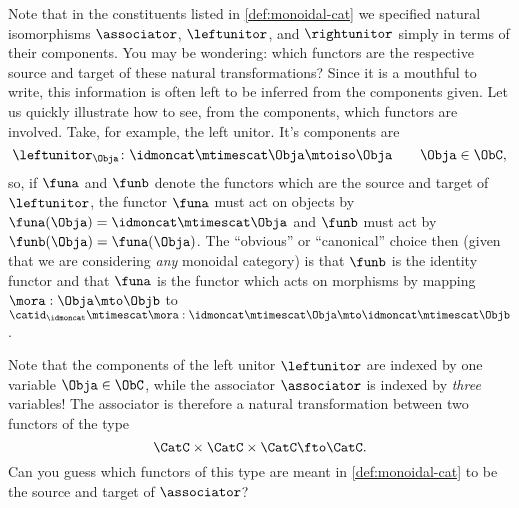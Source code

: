 \begin{remark}
    Note that in the constituents listed in \cref{def:monoidal-cat} we specified natural isomorphisms $\associator$, $\leftunitor$, and $\rightunitor$ simply in terms of their components. You may be wondering: which functors are the respective source and target of these natural transformations? Since it is a mouthful to write, this information is often left to be inferred from the components given. Let us quickly illustrate how to see, from the components, which functors are involved. Take, for example, the left unitor. It's components are
    \begin{equation*}
        \leftunitor_\Obja \colon \idmoncat\mtimescat \Obja \mtoiso \Obja \quad \quad \Obja\in \ObC,
    \end{equation*}
    so, if $\funa$ and $\funb$ denote the functors which are the source and target of $\leftunitor$, the functor $\funa$ must act on objects by $\funa(\Obja) = \idmoncat \mtimescat \Obja$ and $\funb$ must act by $\funb(\Obja) = \funa(\Obja)$. The ``obvious'' or ``canonical'' choice then (given that we are considering \emph{any} monoidal category) is that $\funb$ is the identity functor and that $\funa$ is the functor which acts on morphisms by mapping $\mora : \Obja \mto \Objb$ to $\catid_\idmoncat \mtimescat \mora:   \idmoncat\mtimescat \Obja \mto  \idmoncat\mtimescat \Objb$.

    Note that the components of the left unitor $\leftunitor$ are indexed by one variable $\Obja \in \ObC$, while the associator $\associator$ is indexed by \emph{three} variables! The associator is therefore a natural transformation between two functors of the type
    $$
    \CatC \times \CatC \times \CatC \fto \CatC.
    $$
    Can you guess which functors of this type are meant in \cref{def:monoidal-cat} to be the source and target of $\associator$?
\end{remark}


